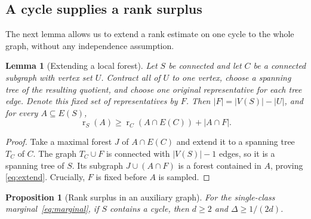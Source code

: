 \documentclass[11pt,reqno]{amsart}
\newtheorem{proposition}[theorem]{Proposition}
\newtheorem{lemma}[theorem]{Lemma}
\theoremstyle{remark}
\numberwithin{equation}{section}
\DeclareMathOperator{\rk}{r}
\begin{document}
\subsection{A cycle supplies a rank surplus}

The next lemma allows us to extend a rank estimate on one cycle to
the whole graph, without any independence assumption.

\begin{lemma}[Extending a local forest]\label{lem:extend}
Let $S$ be connected and let $C$ be a connected subgraph with vertex set
$U$. Contract all of $U$ to one vertex, choose a spanning tree of the
resulting quotient, and choose one original representative for each tree
edge. Denote this fixed set of representatives by $F$. Then
$|F|=|V(S)|-|U|$, and for every $A\subseteq E(S)$,
\begin{equation}\label{eq:extend}
 \rk_S(A)\ge\rk_C(A\cap E(C))+|A\cap F|.
\end{equation}
\end{lemma}

\begin{proof}
Take a maximal forest $J$ of $A\cap E(C)$ and extend it to a spanning
tree $T_C$ of $C$. The graph $T_C\cup F$ is connected with
$|V(S)|-1$ edges, so it is a spanning tree of $S$. Its subgraph
$J\cup(A\cap F)$ is a forest contained in $A$, proving
\eqref{eq:extend}. Crucially, $F$ is fixed before $A$ is sampled.
\end{proof}

\begin{proposition}[Rank surplus in an auxiliary graph]\label{prop:bhm-surplus}
For the single-class marginal~\eqref{eq:marginal}, if $S$ contains a
cycle, then $d\ge2$ and $\Delta\ge1/(2d)$.
\end{proposition}
\end{document}
